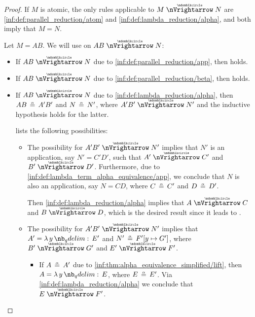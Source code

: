 \begin{proof}
   If \( M \) is atomic, the only rules applicable to \( M \ppred N \) are \ref{inf:def:parallel_reduction/atom} and \ref{inf:def:lambda_reduction/alpha}, and both imply that \( M = N \).

   Let \( M = AB \). We will use  on \( AB \ppred N \):
  \begin{itemize}
    \item If \( AB \ppred N \) due to \ref{inf:def:parallel_reduction/app}, then  holds.

    \item If \( AB \ppred N \) due to \ref{inf:def:parallel_reduction/beta}, then  holds.

    \item If \( AB \ppred N \) due to \ref{inf:def:lambda_reduction/alpha}, then \( AB \aequiv A' B' \) and \( N \aequiv N' \), where \( A' B' \ppred N' \) and the inductive hypothesis holds for the latter.

     lists the following possibilities:
    \begin{itemize}
      \item The possibility  for \( A' B' \ppred N' \) implies that \( N' \) is an application, say \( N' = C' D' \), such that \( A' \ppred C' \) and \( B' \ppred D' \). Furthermore, due to \ref{inf:def:lambda_term_alpha_equivalence/app}, we conclude that \( N \) is also an application, say \( N = CD \), where \( C \aequiv C' \) and \( D \aequiv D' \).

      Then \ref{inf:def:lambda_reduction/alpha} implies that \( A \ppred C \) and \( B \ppred D \), which is the desired result since it leads to .

      \item The possibility  for \( A' B' \ppred N' \) implies that \( A' = \qabs y E' \) and \( N' \aequiv F'[y \mapsto G'] \), where \( B' \ppred G' \) and \( E' \ppred F' \).

      \begin{itemize}
        \item If \( A \aequiv A' \) due to \ref{inf:thm:alpha_equivalence_simplified/lift}, then \( A = \qabs y E \), where \( E \aequiv E' \). Via \ref{inf:def:lambda_reduction/alpha} we conclude that \( E \ppred F' \).


\end{itemize}
\end{itemize}
\end{itemize}
\end{proof}
